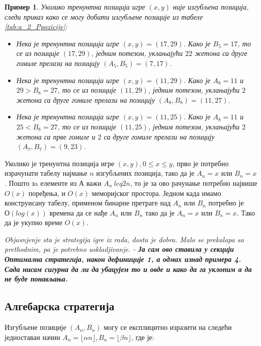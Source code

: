 \documentclass[a4paper]{article}
\newtheorem{example}{Пример}
\begin{document}
\begin{example}
	Уколико тренунтна позиција игре $ (x, y) $ није изгубљена позиција, следи приказ   како се могу добити изгубљене позиције из табеле \ref{tab:a_2_Ppozicije}:
	\begin{itemize}
		\item Нека је тренунтна позиција игре $ (x, y) = (17, 29) $. Како је $ B_{5} = 17 $, то се из позиције $ (17, 29) $, једним потезом, уклањајући $ 22 $ жетона са друге гомиле прелази на позицију $ (A_{5}, B_{5}) = (7, 17) $. 
		\item Нека је тренунтна позиција игре $ (x, y) = (11, 29) $. Како је $ A_{8} = 11 $ и $ 29 > B_{8} = 27 $, то се из позиције $ (11, 29) $, једним потезом, уклањајући $ 2 $ жетона са друге гомиле прелази на позицију $ (A_{8}, B_{8}) = (11, 27) $.
		\item Нека је тренунтна позиција игре $ (x, y) = (11, 25) $. Како је $ A_{8} = 11 $ и $ 25 < B_{8} = 27 $, то се из позиције $ (11, 25) $, једним потезом, уклањајући $ 2 $ жетона са прве гомиле и $ 2 $ са друге гомиле прелази на позицију $ (A_{7}, B_{7}) = (9, 23) $.
	\end{itemize}
\end{example}

Уколико је тренунтна позиција игре $ (x, y), 0 \leq x \leq y $, прво је потребно израчунати табелу најмање $ n $ изгубљених позиција, тако да је $ A_{n} = x $ или $ B_{n} = x $. Пошто зa елементе из $ А $ важи $ A_{n} \ leq 2n $, то је за ово рачунање потребно највише $ O(x) $ поређења, и $ O(x) $ меморијског простора. Једном када имамо конструисану табелу, применом бинарне претраге над $ A_{n} $ или $ B_{n} $ потребно је $ О(log(x)) $ времена да се нађе $ A_{n} $ или $ B_{n} $ тако да је $ A_{n} = x $ или $ B_{n} = x $. Тако да је укупно време $ O(x) $.  

\textit{Objasnjenje sta je strategija igre iz rada, dosta je dobra. Malo se prekalapa sa prethodnim, pa je potrebno uskladjivanje. - \textbf{Ја сам ово ставила у секцији Оптимална стратегија, након дефиниције 1, а одмах изнад примера 4. Сада нисам сигурна да ли да убацујем то и овде и како да га уклопим а да не буде понављања.}}

\subsection{Алгебарска стратегија}

Изгубљене позиције $ (A_{n}, B_{n}) $ могу се експлицитно изразити на следећи једноставан начин $ A_{n} = \lfloor \alpha n \rfloor, B_{n} = \lfloor \beta n \rfloor $, где је:
\end{document}
